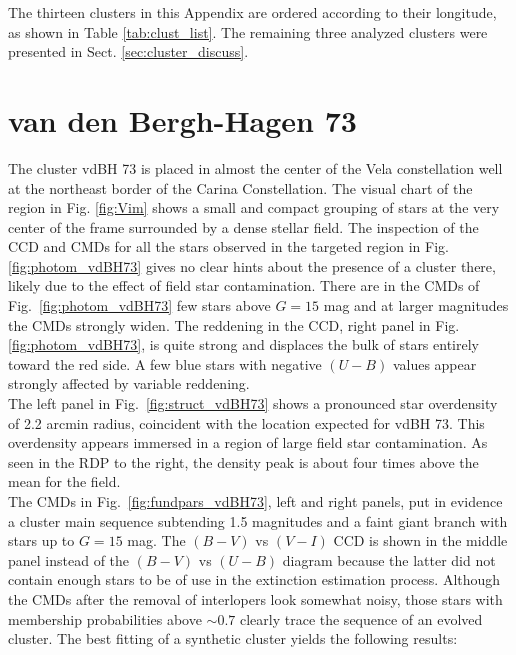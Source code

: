 \documentclass[draft]{aa}
\begin{document}
\appendix

The thirteen clusters in this Appendix are ordered according to their
longitude, as shown in Table \ref{tab:clust_list}. The remaining three
analyzed clusters were presented in Sect. \ref{sec:cluster_discuss}.


\section{van den Bergh-Hagen 73}

The cluster vdBH 73 is placed in almost the center of the Vela
constellation well at the northeast border of the Carina Constellation. The
visual chart of the region in Fig. \ref{fig:Vim} shows a small and compact
grouping of stars at the very center of the frame surrounded by a dense stellar
field.
The inspection of the CCD and CMDs for all the stars observed
in the targeted region in Fig. \ref{fig:photom_vdBH73} gives no clear
hints about the presence of a cluster there, likely due to the
effect of field star contamination.
There are in the CMDs of Fig.~\ref{fig:photom_vdBH73} few stars above $G=15$
mag and at larger magnitudes the CMDs strongly widen.
The reddening in the CCD, right panel in Fig. \ref{fig:photom_vdBH73}, is quite
strong and displaces the bulk of stars entirely toward the red side. A
few blue stars with negative $(U-B)$ values appear strongly affected by
variable reddening.\\

The left panel in Fig.~\ref{fig:struct_vdBH73} shows a pronounced star
overdensity of 2.2 arcmin radius, coincident with the location expected for
vdBH 73. This overdensity appears immersed in a region of large field
star contamination. As seen in the RDP to the right, the density peak is about
four times above the mean for the field.\\

The CMDs in Fig.~\ref{fig:fundpars_vdBH73}, left and right panels, put in
evidence a cluster main sequence subtending 1.5 magnitudes and a faint giant
branch with stars up to $G=15$ mag.
The $(B-V)$ vs $(V-I)$ CCD is shown in the middle panel instead of the
$(B-V)$ vs $(U-B)$ diagram because the latter did not contain enough stars to
be of use in the extinction estimation process.
Although the CMDs after the removal of interlopers look somewhat noisy,
those stars with membership probabilities above $\sim0.7$ clearly
trace the sequence of an evolved cluster.
The best fitting of a synthetic cluster yields the following results:
\end{document}
